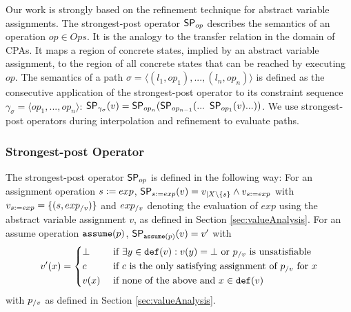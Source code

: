 \label{sec:assignmentRefinement}
Our work is strongly based on the refinement technique for abstract variable assignments.
The strongest-post operator $\operatorname{\operatorname{\mathsf{SP}}}_{op}$ describes the semantics of an operation $op \in Ops$.
It is the analogy to the transfer relation in the domain of CPAs.
It maps a region of concrete states, implied by an abstract variable assignment, to the region of all concrete states that can be reached by executing $op$.
The semantics of a path $\sigma = \langle (l_1, op_1), ..., (l_n, op_n) \rangle$ is defined as the consecutive application of the strongest-post operator to its constraint sequence $\gamma_\sigma = \langle op_1, ..., op_n \rangle$:
$\strongestPostOp_{\gamma_\sigma}(v) = \strongestPostOp_{op_n}(\strongestPostOp_{op_{n-1}} (...\ \strongestPostOp_{op_1}(v) ... ))$.
We use strongest-post operators during interpolation and refinement to evaluate paths.

\subsubsection*{Strongest-post Operator}
The strongest-post operator $\operatorname{\operatorname{\operatorname{\mathsf{SP}}}}_{op}$ is defined in the following way:
For an assignment operation $s := exp$, $\operatorname{\operatorname{\operatorname{\mathsf{SP}}}}_{s := exp}(v) = v_{|X \setminus \{ s \}} \wedge v_{s := exp}$ with $v_{s := exp} = \{ (s, exp_{/v}) \}$ and $exp_{/v}$ denoting the evaluation of $exp$ using the abstract variable assignment $v$, as defined in Section \ref{sec:valueAnalysis}.
For an assume operation $\texttt{assume}(p)$, 
	$\operatorname{\operatorname{\operatorname{\mathsf{SP}}}}_{\texttt{assume}(p)}(v) = v'$ with 
	\[ v'(x) = \begin{dcases}
		\bot & \text{ if } \exists y \in \texttt{def}(v) : v(y) = \bot \text{ or } p_{/v} \text{ is unsatisfiable}\\
		c & \text{ if $c$ is the only satisfying assignment of $p_{/v}$ for $x$}\\
		v(x) & \text{ if none of the above and } x \in \texttt{def}(v)
	\end{dcases}\]
	with $p_{/v}$ as defined in Section \ref{sec:valueAnalysis}.

